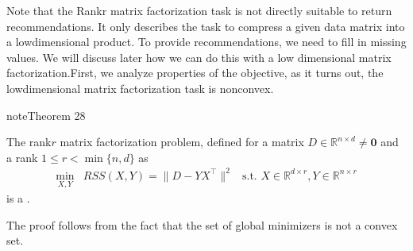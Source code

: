 \documentclass[letterpaper,10pt,english]{jupyterBook}
\begin{document}
\sphinxAtStartPar
Note that the Rank\sphinxhyphen{}r matrix factorization task is not directly suitable to return recommendations. It only describes the task to compress a given data matrix into a low\sphinxhyphen{}dimensional product. To provide recommendations, we need to fill in missing values. We will discuss later how we can do this with a low dimensional matrix factorization.First, we analyze properties of the objective, as it turns out, the low\sphinxhyphen{}dimensional matrix factorization task is nonconvex.
\label{dim_reduction_mf:theorem-0}
\begin{sphinxadmonition}{note}{Theorem 28}



\sphinxAtStartPar
The rank\sphinxhyphen{}\(r\) matrix factorization problem, defined for a matrix \(D\in\mathbb{R}^{n\times d}\neq\mathbf{0}\) and a rank \(1\leq r<\min\{n,d\}\) as
\begin{align*}
    \min_{X,Y}& RSS(X,Y)=\lVert D- YX^\top\rVert^2 & \text{s.t. } X\in \mathbb{R}^{d\times r}, Y\in\mathbb{R}^{n\times r}
\end{align*}
\sphinxAtStartPar
is a .
\end{sphinxadmonition}

\sphinxAtStartPar
The proof follows from the fact that the set of global minimizers is not a convex set.
\end{document}
